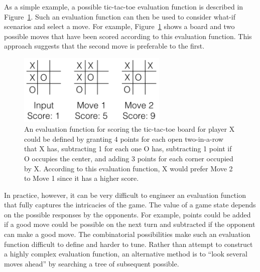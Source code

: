 \documentclass{sig-alternate}
\begin{document}
As a simple example, a possible tic-tac-toe evaluation function is described in Figure~\ref{fig:tictactoe}. Such an evaluation function can then be used to consider what-if scenarios and select a move. For example, Figure~\ref{fig:tictactoe} shows a board and two possible moves that have been scored according to this evaluation function. This approach suggests that the second move is preferable to the first. 

\begin{figure}[h!tbp]
\begin{center}
\includegraphics[width=2.8in]{ttt.png}
\caption{An evaluation function for scoring the tic-tac-toe board for player X could be defined by granting 4 points for each open two-in-a-row that X has, subtracting 1 for each one O has, subtracting 1 point if O occupies the center, and adding 3 points for each corner occupied by X.
According to this evaluation function, X would prefer Move 2 to Move 1 since it has a higher score.\label{fig:tictactoe}}
\end{center}
\end{figure}

In practice, however, it can be very difficult to engineer an evaluation function that fully captures the intricacies of the game. The value of a game state depends on the possible responses by the opponents. 
For example, points could be added if a good move could be possible on the next turn and subtracted if the opponent can make a good move. 
The combinatorial possibilities make such an evaluation function difficult to define and harder to tune.
Rather than attempt to construct a highly complex evaluation function, an alternative method is to ``look several moves ahead'' by searching a tree of subsequent possible.
\end{document}

